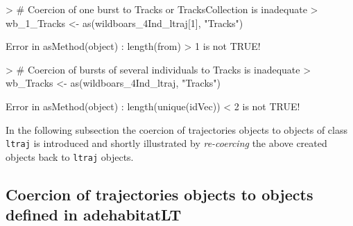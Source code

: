 \documentclass[12pt, oneside, a4paper]{scrbook}
\newcommand{\pkg}[1]{{\normalfont\fontseries{b}\selectfont #1}}
\let\code=\texttt
\begin{document}
\par\medskip

\begin{small}
\begin{Schunk}
\begin{Sinput}
> # Coercion of one burst to Tracks or TracksCollection is inadequate
> wb_1_Tracks <- as(wildboars_4Ind_ltraj[1], "Tracks")
\end{Sinput}
\end{Schunk}
\end{small}

\begin{small}
\begin{Schunk}
\begin{Soutput}
Error in asMethod(object) : length(from) > 1 is not TRUE!
\end{Soutput}
\end{Schunk}
\end{small}

\begin{small}
\begin{Schunk}
\begin{Sinput}
> # Coercion of bursts of several individuals to Tracks is inadequate
> wb_Tracks <- as(wildboars_4Ind_ltraj, "Tracks")
\end{Sinput}
\end{Schunk}
\end{small}

\begin{small}
\begin{Schunk}
\begin{Soutput}
Error in asMethod(object) : length(unique(idVec)) < 2 is not TRUE!
\end{Soutput}
\end{Schunk}
\end{small}

\par\medskip

In the following subsection the coercion of \pkg{trajectories} objects to objects of class \code{ltraj} is introduced and shortly illustrated by \textit{re-coercing} the above created objects back to \code{ltraj} objects. 

\par\medskip


\subsection*{Coercion of \pkg{trajectories} objects to objects defined in \pkg{adehabitatLT}}
\end{document}
